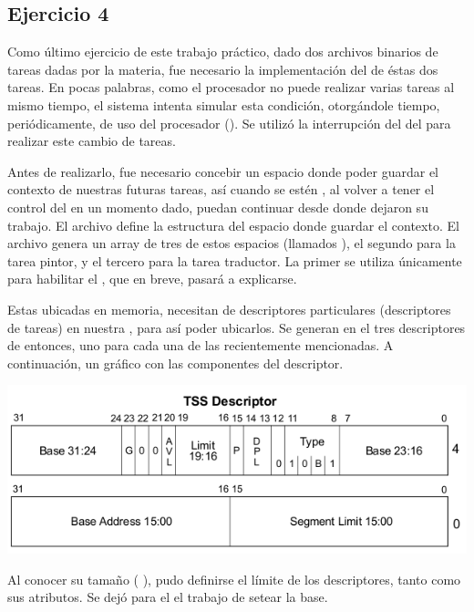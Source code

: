 \subsection{Ejercicio 4}
	Como último ejercicio de este trabajo práctico, dado dos archivos binarios de tareas dadas por la materia, fue necesario la implementación del 
 de éstas dos tareas. En pocas palabras, como el procesador no puede realizar varias tareas al mismo tiempo, el sistema intenta simular 
esta condición, otorgándole tiempo, periódicamente, de uso del procesador (). Se utilizó la interrupción del  del 
 para realizar este cambio de tareas.

	Antes de realizarlo, fue necesario concebir un espacio donde poder guardar el contexto de nuestras futuras tareas, así cuando se estén , 
al volver a tener el control del  en un momento dado, puedan continuar desde donde dejaron su trabajo. El archivo  define la 
estructura del espacio donde guardar el contexto. El archivo  genera un array de tres de estos espacios (llamados ), el segundo 
para la tarea pintor, y el tercero para la tarea traductor. La primer  se utiliza únicamente para habilitar el , que en 
breve, pasará a explicarse.

	Estas  ubicadas en memoria, necesitan de descriptores particulares (descriptores de tareas) en nuestra , para así poder 
ubicarlos. Se generan en el  tres descriptores de  entonces, uno para cada una de las recientemente mencionadas. A continuación, 
un gráfico con las componentes del descriptor. 

\begin{center}
\includegraphics[scale=0.4]{tss_descriptor.png}
\end{center}

Al conocer su tamaño ( ), pudo definirse el límite de los descriptores, tanto como sus atributos. Se dejó para el  
el trabajo de setear la base.

